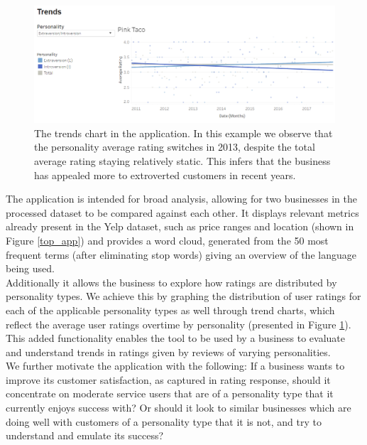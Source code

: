 \documentclass[sigconf, nonacm]{acmart}
\begin{document}
\begin{center}
\begin{figure}
\includegraphics[width = 0.9 \columnwidth]{bottom_app}
\caption{The trends chart in the application. In this example we observe that the personality average rating switches in 2013, despite the total average rating staying relatively static. This infers that the business has appealed more to extroverted customers in recent years. }
\label{bottom_app}

\end{figure}
\end{center}



The application is intended for broad analysis, allowing for two businesses in the processed dataset to be compared against each other. It displays relevant metrics already present in the Yelp dataset, such as price ranges and location (shown in Figure \ref{top_app}) and provides a word cloud, generated from the 50 most frequent terms (after eliminating stop words) giving an overview of the language being used.  \\


Additionally it allows the business to explore how ratings are distributed by personality types. We achieve this by graphing the distribution of user ratings for each of the applicable personality types as well through trend charts, which reflect the average user ratings overtime by personality (presented in Figure \ref{bottom_app}).  \\

This added functionality enables the tool to be used by a business to evaluate and understand trends in ratings given by reviews of varying personalities.   \\

We further motivate the application with the following: If a business wants to improve its customer satisfaction, as captured in rating response, should it concentrate on moderate service users that are of a personality type that it currently enjoys success with? Or should it look to similar businesses which are doing well with customers of a personality type that it is not, and try to understand and emulate its success? \\
\end{document}
